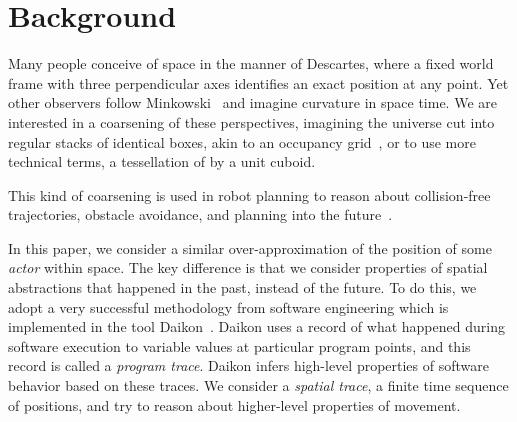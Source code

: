 \section{Background}
\label{sec:background}

Many people conceive of space in the manner of Descartes, where a fixed world frame with three perpendicular axes identifies an exact position at any point.  
Yet other observers follow Minkowski~\cite{minkowski1952space} and imagine curvature in space time.
We are interested in a coarsening of these perspectives, imagining the universe cut into regular stacks of identical boxes, akin to an occupancy grid~\cite{moravec1985high}, or to use more technical terms, a tessellation of \rthree by a unit cuboid.



This kind of coarsening is used in robot planning to reason about collision-free trajectories, obstacle avoidance, and planning into the future~\cite{siegwart2011introduction}.

In this paper, we consider a similar over-approximation of the position of some \emph{actor} within space. 
The key difference is that we consider properties of spatial abstractions that happened in the past, instead of the future.
To do this, we adopt a very successful methodology from software engineering which is implemented in the tool Daikon~\cite{kataoka2001automated}.
Daikon uses a record of what happened during software execution to variable values at particular program points, and this record is called a \emph{program trace}.  Daikon infers high-level properties of software behavior based on these traces.
We consider a \emph{spatial trace}, a finite time sequence of positions, and try to reason about higher-level properties of movement.


